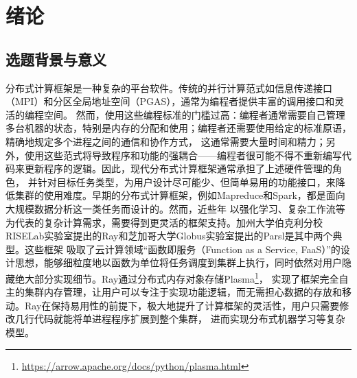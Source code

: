 
\chapter{绪论}
\label{cha:introduction}
\section{选题背景与意义}
\label{sec:background}

分布式计算框架是一种复杂的平台软件。传统的并行计算范式如信息传递接口（MPI\cite{gabriel2004open}）和分区全局地址空间（PGAS\cite{zheng2014upc++}），通常为编程者提供丰富的调用接口和灵活的编程空间。
然而，使用这些编程标准的门槛过高：编程者通常需要自己管理多台机器的状态，特别是内存的分配和使用；编程者还需要使用给定的标准原语，精确地规定多个进程之间的通信和协作方式，
这通常需要大量时间和精力；另外，使用这些范式将导致程序和功能的强耦合——编程者很可能不得不重新编写代码来更新程序的逻辑。因此，现代分布式计算框架通常承担了上述硬件管理的角色，
并针对目标任务类型，为用户设计尽可能少、但简单易用的功能接口，来降低集群的使用难度。早期的分布式计算框架，例如Mapreduce\cite{dean2008mapreduce}和Spark\cite{zaharia2010spark}，都是面向大规模数据分析这一类任务而设计的。然而，近些年
以强化学习、复杂工作流等为代表的复杂计算需求，需要得到更灵活的框架支持。加州大学伯克利分校RISELab实验室提出的Ray\cite{moritz2018ray}和芝加哥大学Globus实验室提出的Parsl\cite{babuji2019parsl}是其中两个典型。这些框架
吸取了云计算领域“函数即服务（Function as a Service, FaaS）”的设计思想，能够细粒度地以函数为单位将任务调度到集群上执行，同时依然对用户隐藏绝大部分实现细节。Ray通过分布式内存对象存储Plasma\footnote{\url{https://arrow.apache.org/docs/python/plasma.html}}，
实现了框架完全自主的集群内存管理，让用户可以专注于实现功能逻辑，而无需担心数据的存放和移动。Ray在保持易用性的前提下，极大地提升了计算框架的灵活性，用户只需要修改几行代码就能将单进程程序扩展到整个集群，
进而实现分布式机器学习等复杂模型。

